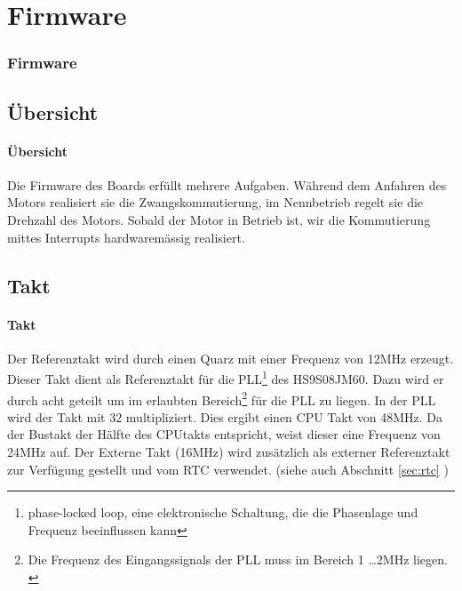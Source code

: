 \ifSTANDALONE
\section{Firmware}
\fi
\ifEMBED
\subsubsection{Firmware}
\label{sec:ET_Firmware}
\fi
\ifSTANDALONE
\subsection{Übersicht}
\fi
\ifEMBED
\paragraph{Übersicht}$~~$\vspace{2mm}\\
\fi
Die Firmware des Boards erfüllt mehrere Aufgaben. Während dem Anfahren des 
Motors realisiert sie die Zwangskommutierung, im Nennbetrieb regelt sie die 
Drehzahl des Motors. Sobald der Motor in Betrieb ist, wir die Kommutierung 
mittes Interrupts hardwaremässig
realisiert.
\ifSTANDALONE
\subsection{Takt}
\fi
\ifEMBED
\paragraph{Takt}$~~$\vspace{2mm}\\
\fi
Der Referenztakt wird durch einen Quarz mit einer Frequenz von 
12\si{\mega\hertz} erzeugt.  Dieser Takt dient als Referenztakt für die 
PLL\footnote{phase-locked loop, eine elektronische Schaltung, die die 
Phasenlage und Frequenz beeinflussen kann} des HS9S08JM60. Dazu wird er durch 
acht geteilt um im erlaubten Bereich\footnote{Die Frequenz des Eingangssignals 
der PLL muss im Bereich 1 \ldots 2\si{\mega\hertz} liegen. \cite[p.  
195]{Datasheet:HCS08}} für die PLL zu liegen. In der PLL wird der Takt mit 32 
multipliziert. Dies ergibt einen CPU Takt von 48\si{\mega\hertz}. Da der 
Bustakt der Hälfte des CPUtakts entspricht, weist dieser eine Frequenz von 
24\si{\mega\hertz} auf.  Der Externe Takt (16\si{\mega\hertz}) wird zusätzlich 
als externer Referenztakt zur Verfügung gestellt und vom RTC verwendet.  
(siehe auch Abschnitt \ref{sec:rtc} )

\ifSTANDALONE
